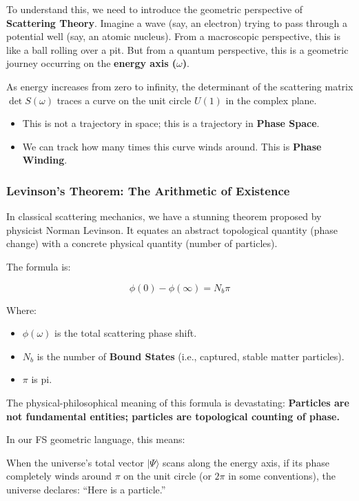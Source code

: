 To understand this, we need to introduce the geometric perspective of \textbf{Scattering Theory}. Imagine a wave (say, an electron) trying to pass through a potential well (say, an atomic nucleus). From a macroscopic perspective, this is like a ball rolling over a pit. But from a quantum perspective, this is a geometric journey occurring on the \textbf{energy axis ($\omega$)}.

As energy increases from zero to infinity, the determinant of the scattering matrix $\det S(\omega)$ traces a curve on the unit circle $U(1)$ in the complex plane.

\begin{itemize}
\item This is not a trajectory in space; this is a trajectory in \textbf{Phase Space}.

\item We can track how many times this curve winds around. This is \textbf{Phase Winding}.
\end{itemize}

\subsubsection{Levinson's Theorem: The Arithmetic of Existence}

In classical scattering mechanics, we have a stunning theorem proposed by physicist Norman Levinson. It equates an abstract topological quantity (phase change) with a concrete physical quantity (number of particles).

The formula is:

\[\phi(0) - \phi(\infty) = N_b \pi\]

Where:

\begin{itemize}
\item $\phi(\omega)$ is the total scattering phase shift.

\item $N_b$ is the number of \textbf{Bound States} (i.e., captured, stable matter particles).

\item $\pi$ is pi.
\end{itemize}

The physical-philosophical meaning of this formula is devastating: \textbf{Particles are not fundamental entities; particles are topological counting of phase.}

In our FS geometric language, this means:

When the universe's total vector $|\Psi\rangle$ scans along the energy axis, if its phase completely winds around \textbf{$\pi$} on the unit circle (or $2\pi$ in some conventions), the universe declares: ``Here is a particle.''

